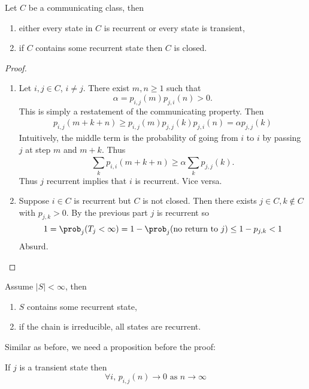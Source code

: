 \documentclass[a4paper]{article}
\begin{document}
\begin{theorem}
  Let \(C\) be a communicating class, then
  \begin{enumerate}
  \item either every state in \(C\) is recurrent or every state is transient,
  \item if \(C\) contains some recurrent state then \(C\) is closed.
  \end{enumerate}
\end{theorem}

\begin{proof}\leavevmode
  \begin{enumerate}
  \item Let \(i,j \in C\), \(i \neq j\). There exist \(m,n\geq 1\) such that
    \[
      \alpha = p_{i,j}(m)p_{j,i}(n) >0.
    \]
    This is simply a restatement of the communicating property. Then
    \begin{align*}
      p_{i,j}(m+k+n) \geq p_{i,j}(m)p_{j,j}(k)p_{j,i}(n) = \alpha p_{j,j}(k)
    \end{align*}
    Intuitively, the middle term is the probability of going from \(i\) to \(i\) by passing \(j\) at step \(m\) and \(m+k\).
    Thus
    \[
      \sum_{k}^{}p_{i,i}(m+k+n) \geq \alpha \sum_{k}^{ }p_{j,j}(k).
    \]
    Thus \(j\) recurrent implies that \(i\) is recurrent. Vice versa.
  \item Suppose \(i\in C\) is recurrent but \(C\) is not closed. Then there exists \(j\in C, k\notin C\) with \(p_{j,k} > 0\). By the previous part \(j\) is recurrent so
    \[
      1 = \prob_j(T_j < \infty) = 1 - \prob_j(\text{no return to } j) \leq 1- p_{j,k} < 1
    \]
    Absurd.
  \end{enumerate}
\end{proof}

\begin{theorem}
  \label{thm:recurrent irreducible chain}
  Assume \(|S| < \infty\), then
  \begin{enumerate}
  \item \(S\) contains some recurrent state,
  \item if the chain is irreducible, all states are recurrent.
  \end{enumerate}
\end{theorem}

Similar as before, we need a proposition before the proof:
  \begin{proposition}
    If \(j\) is a transient state then
    \[
      \forall i,\, p_{i,j}(n) \to 0 \text{ as } n\to\infty
    \]
  \end{proposition}
\end{document}
